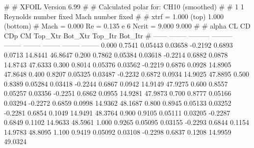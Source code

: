 #  
#       XFOIL         Version 6.99
#  
# Calculated polar for: CH10 (smoothed)                                 
#  
# 1 1 Reynolds number fixed          Mach number fixed         
#  
# xtrf =   1.000 (top)        1.000 (bottom)  
# Mach =   0.000     Re =     0.135 e 6     Ncrit =   9.000  9.000
#  
#   alpha    CL        CD       CDp       CM     Top_Xtr  Bot_Xtr  Top_Itr  Bot_Itr
#  ------ -------- --------- --------- -------- -------- -------- -------- --------
   0.000   0.7541   0.05443   0.03658  -0.2192   0.6893   0.0713  14.8441  46.8647
   0.200   0.7862   0.05384   0.03618  -0.2214   0.6882   0.0878  14.8743  47.6333
   0.300   0.8014   0.05376   0.03562  -0.2219   0.6876   0.0928  14.8905  47.8648
   0.400   0.8207   0.05325   0.03487  -0.2232   0.6872   0.0934  14.9025  47.8895
   0.500   0.8389   0.05284   0.03418  -0.2244   0.6867   0.0942  14.9149  47.9275
   0.600   0.8557   0.05257   0.03356  -0.2251   0.6862   0.0955  14.9281  47.9873
   0.700   0.8777   0.05166   0.03294  -0.2272   0.6859   0.0998  14.9362  48.1687
   0.800   0.8945   0.05133   0.03252  -0.2281   0.6854   0.1049  14.9491  48.3764
   0.900   0.9105   0.05111   0.03205  -0.2287   0.6849   0.1102  14.9633  48.5961
   1.000   0.9265   0.05095   0.03155  -0.2293   0.6844   0.1154  14.9783  48.8095
   1.100   0.9419   0.05092   0.03108  -0.2298   0.6837   0.1208  14.9959  49.0324
